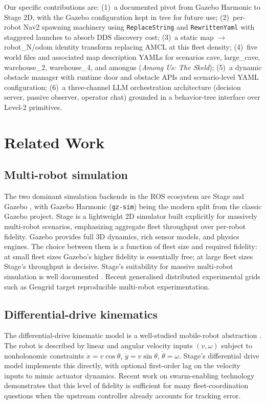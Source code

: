 \documentclass[conference]{IEEEtran}
\begin{document}
Our specific contributions are:
(1)~a documented pivot from Gazebo Harmonic to Stage 2D, with
the Gazebo configuration kept in tree for future use;
(2)~per-robot Nav2 spawning machinery using
\texttt{ReplaceString} and \texttt{RewrittenYaml} with
staggered launches to absorb DDS discovery cost;
(3)~a static \textsf{map} $\to$ \textsf{robot\_N/odom}
identity transform replacing AMCL at this fleet density;
(4)~five world files and associated map description YAMLs for
scenarios \textsf{cave}, \textsf{large\_cave},
\textsf{warehouse\_2}, \textsf{warehouse\_4}, and
\textsf{amongus} (\emph{Among Us: The Skeld});
(5)~a dynamic obstacle manager with runtime door and obstacle
APIs and scenario-level YAML configuration;
(6)~a three-channel LLM orchestration architecture
(decision server, passive observer, operator chat) grounded in
a behavior-tree interface over Level-2 primitives.

\section{Related Work}
\label{sec:related}

\subsection{Multi-robot simulation}

The two dominant simulation backends in the ROS ecosystem are
Stage \cite{vaughan2008stage} and Gazebo
\cite{koenig2004gazebo}, with Gazebo Harmonic
(\texttt{gz-sim}) being the modern split from the classic
Gazebo project. Stage is a lightweight 2D simulator built
explicitly for massively multi-robot scenarios, emphasizing
aggregate fleet throughput over per-robot fidelity. Gazebo
provides full 3D dynamics, rich sensor models, and physics
engines. The choice between them is a function of fleet size
and required fidelity: at small fleet sizes Gazebo's higher
fidelity is essentially free; at large fleet sizes Stage's
throughput is decisive. Stage's suitability for massive
multi-robot simulation is well documented
\cite{vaughan2008stage}. Recent generalised distributed
experimental grids such as Gengrid \cite{kedia2025gengrid}
target reproducible multi-robot experimentation.

\subsection{Differential-drive kinematics}

The differential-drive kinematic model is a well-studied
mobile-robot abstraction \cite{siwek2023diffdrive,siegwart2011}.
The robot is described by linear and angular velocity inputs
$(v, \omega)$ subject to nonholonomic constraints
$\dot{x} = v\cos\theta$, $\dot{y} = v\sin\theta$,
$\dot{\theta} = \omega$. Stage's differential drive model
implements this directly, with optional first-order lag on the
velocity inputs to mimic actuator dynamics. Recent work on
swarm-enabling technology \cite{chamanbaz2017swarmenabling}
demonstrates that this level of fidelity is sufficient for many
fleet-coordination questions when the upstream controller
already accounts for tracking error.
\end{document}
